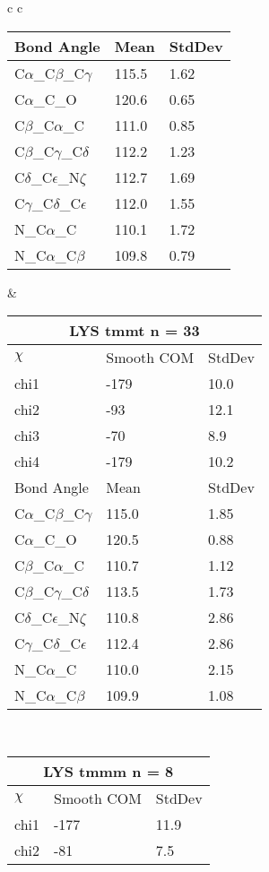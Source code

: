 \begin{longtable}{ c c }
\begin{tabular}{ l l l }
  Bond Angle   & Mean     & StdDev \\ \midrule
  C$\alpha$\_C$\beta$\_C$\gamma$ & 115.5 & 1.62\\
  C$\alpha$\_C\_O & 120.6 & 0.65\\
  C$\beta$\_C$\alpha$\_C & 111.0 & 0.85\\
  C$\beta$\_C$\gamma$\_C$\delta$ & 112.2 & 1.23\\
  C$\delta$\_C$\epsilon$\_N$\zeta$ & 112.7 & 1.69\\
  C$\gamma$\_C$\delta$\_C$\epsilon$ & 112.0 & 1.55\\
  N\_C$\alpha$\_C & 110.1 & 1.72\\
  N\_C$\alpha$\_C$\beta$ & 109.8 & 0.79\\
  \bottomrule
  \end{tabular}
  &
  \begin{tabular}{ l l l }
  \toprule
  \multicolumn{3}{c}{LYS \textbf{tmmt} n = 33} \\ \toprule
  $\chi$       & Smooth COM & StdDev \\ \midrule
  chi1 & -179 & 10.0 \\ 
  chi2 & -93 & 12.1 \\ 
  chi3 & -70 & 8.9 \\ 
  chi4 & -179 & 10.2 \\ \midrule
  Bond Angle   & Mean     & StdDev \\ \midrule
  C$\alpha$\_C$\beta$\_C$\gamma$ & 115.0 & 1.85\\
  C$\alpha$\_C\_O & 120.5 & 0.88\\
  C$\beta$\_C$\alpha$\_C & 110.7 & 1.12\\
  C$\beta$\_C$\gamma$\_C$\delta$ & 113.5 & 1.73\\
  C$\delta$\_C$\epsilon$\_N$\zeta$ & 110.8 & 2.86\\
  C$\gamma$\_C$\delta$\_C$\epsilon$ & 112.4 & 2.86\\
  N\_C$\alpha$\_C & 110.0 & 2.15\\
  N\_C$\alpha$\_C$\beta$ & 109.9 & 1.08\\
  \bottomrule
  \end{tabular}
  \\
  \begin{tabular}{ l l l }
  \toprule
  \multicolumn{3}{c}{LYS \textbf{tmmm} n = 8} \\ \toprule
  $\chi$       & Smooth COM & StdDev \\ \midrule
  chi1 & -177 & 11.9 \\ 
  chi2 & -81 & 7.5 \\ 

\end{tabular}
\end{longtable}
